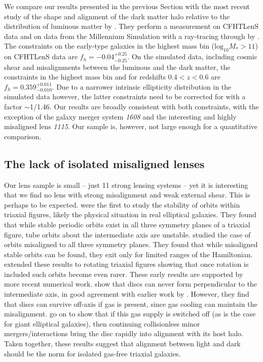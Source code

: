 \documentclass[useAMS,usenatbib]{mn2e}
\begin{document}
We compare our results presented in the previous Section with the most recent study of the shape and alignment of the dark matter halo relative to the distribution of luminous matter by \citet{2015arXiv150704301S}. They perform a measurement on CFHTLenS data and on data from the Millennium Simulation \citep{2005Natur.435..629S} with a ray-tracing through by \citet{2009A&A...499...31H}. The constraints on the early-type galaxies in the highest mass bin ($\mathrm{log_{10}}M_{*}>11$) on CFHTLenS data are $f_{h}=-0.04^{+0.25}_{-0.25}$. On the simulated data, including cosmic shear and misalignments between the luminous and the dark matter, the constraints in the highest mass bin and for redshifts $0.4<z<0.6$ are $f_{h} = 0.359^{+0.011}_{-0.010}$. Due to a narrower intrinsic ellipticity distribution in the simulated data however, the latter constraints need to be corrected for with a factor $\sim$1/1.46. Our results are broadly consistent with both constraints, with the exception of the galaxy merger system \textit{1608} and the interesting and highly misaligned lens \textit{1115}. Our sample is, however, not large enough for a quantitative comparison.

\subsection{The lack of isolated misaligned lenses}

Our lens sample is small -- just 11 strong lensing systems -- yet it is interesting that we find no lens with strong misalignment and weak external shear. This is perhaps to be expected. \citet{1979ApJ...233..872H} were the first to study the stability of orbits within triaxial figures, likely the physical situation in real elliptical galaxies. They found that while stable periodic orbits exist in all three symmetry planes of a triaxial figure, tube orbits about the intermediate axis are unstable. \citet{1985MNRAS.215..731D} studied the case of orbits misaligned to all three symmetry planes. They found that while misaligned stable orbits can be found, they exit only for limited ranges of the Hamiltonian. \citet{1988A&A...206..269M} extended these results to rotating triaxial figures showing that once rotation is included such orbits become even rarer. These early results are supported by more recent numerical work. \citet{2013MNRAS.434.2971D} show that discs can never form perpendicular to the intermediate axis, in good agreement with earlier work by \citet{1979ApJ...233..872H}. However, they find that discs can survive off-axis if gas is present, since gas cooling can maintain the misalignment. \citet{2015MNRAS.452.4094D} go on to show that if this gas supply is switched off (as is the case for giant elliptical galaxies), then continuing collisionless minor mergers/interactions bring the disc rapidly into alignment with its host halo. Taken together, these results suggest that alignment between light and dark should be the norm for isolated gas-free triaxial galaxies.
\end{document}
